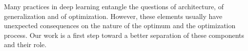 
Many practices in deep learning entangle the questions of architecture, of generalization and of optimization. However, these elements usually have unexpected consequences on the nature of the optimum and the optimization process. Our work is a first step toward a better separation of these components and their role.